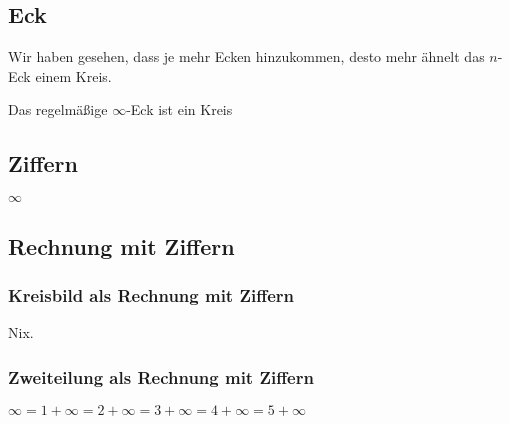 \documentclass[a4paper]{amsart}
\theoremstyle{definition}
\begin{document}
\subsection{Eck}
Wir haben gesehen, dass je mehr Ecken hinzukommen, desto mehr ähnelt das $n$-Eck einem Kreis.

Das regelmäßige $\infty$-Eck ist ein Kreis
\vspace{\kategoryVspace}


\subsection{Ziffern}
\vspace{\kategoryVspace}

{\Huge $\infty$}

\subsection{Rechnung mit Ziffern}

\subsubsection{Kreisbild als Rechnung mit Ziffern}
Nix.

\subsubsection{Zweiteilung als Rechnung mit Ziffern}
$\infty = 1 + \infty = 2 + \infty = 3 + \infty = 4 + \infty = 5 + \infty$
\end{document}

